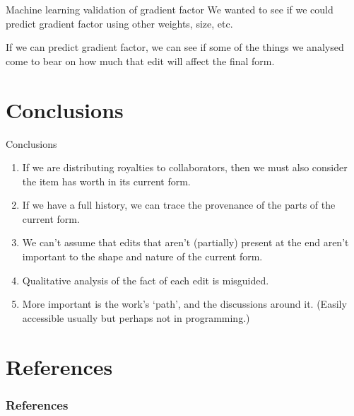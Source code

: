 \documentclass[t]{beamer}
\begin{document}
\begin{frame}{Machine learning validation of gradient factor}
  We wanted to see if we could predict gradient factor using other
  weights, size, etc.

  If we can predict gradient factor, we can see if some of the things
  we analysed come to bear on how much that edit will affect the final
  form.
 

\end{frame}

\section{Conclusions}
\begin{frame}{Conclusions}

\begin{enumerate}[<+->]  
\item If we are distributing royalties to collaborators, then we must also consider the item has worth in its current form.
\item If we have a full history, we can trace the provenance of the parts of the current form.
\item We can't assume that edits that aren't (partially) present at the end aren't important to the shape and nature of the current form.
\item Qualitative analysis of the fact of each edit is misguided.
\item More important is the work's `path', and the discussions around
  it. (Easily accessible usually but perhaps not in programming.)
\end{enumerate}
\end{frame}

  \section{References}
  \begin{frame}[allowframebreaks] %
    \frametitle{References}
    \scriptsize{}
  \end{frame}
\end{document}
